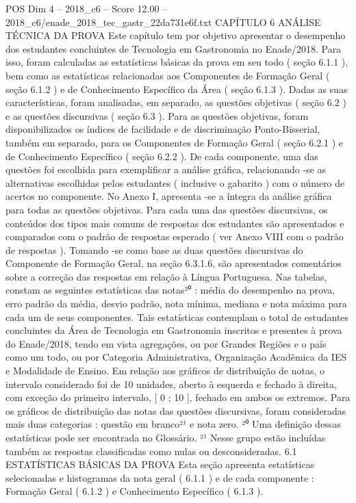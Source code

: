 \begin{textsample}{POS Dim 4 – 2018\_c6 – Score 12.00 – 2018\_c6/enade\_2018\_tec\_gastr\_22da731e6f.txt}  \label{ex:f4_pos_013}
CAPÍTULO 6 ANÁLISE TÉCNICA DA PROVA Este capítulo tem por objetivo apresentar o desempenho dos estudantes concluintes de Tecnologia em Gastronomia no Enade/2018.
Para isso, foram calculadas as estatísticas básicas da prova em seu todo ( seção 6.1.1 ), bem como as estatísticas relacionadas aos Componentes de Formação Geral ( seção 6.1.2 ) e de Conhecimento Específico da Área ( seção 6.1.3 ).
Dadas as suas características, foram analisadas, em separado, as questões objetivas ( seção 6.2 ) e as questões discursivas ( seção 6.3 ).
Para as questões objetivas, foram disponibilizados os índices de facilidade e de discriminação Ponto-Bisserial, também em separado, para os Componentes de Formação Geral ( seção 6.2.1 ) e de Conhecimento Específico ( seção 6.2.2 ).
De cada componente, uma das questões foi escolhida para exemplificar a análise gráfica, relacionando -se as alternativas escolhidas pelos estudantes ( inclusive o gabarito ) com o número de acertos no componente.
No Anexo I, apresenta -se a íntegra da análise gráfica para todas as questões objetivas.
Para cada uma das questões discursivas, os conteúdos dos tipos mais comuns de respostas dos estudantes são apresentados e comparados com o padrão de respostas esperado ( ver Anexo VIII com o padrão de respostas ).
Tomando -se como base as duas questões discursivas do Componente de Formação Geral, na seção 6.3.1.6, são apresentados comentários sobre a correção das respostas em relação à Língua Portuguesa.
Nas tabelas, constam as seguintes estatísticas das notas²⁰ : média do desempenho na prova, erro padrão da média, desvio padrão, nota mínima, mediana e nota máxima para cada um de seus componentes.
Tais estatísticas contemplam o total de estudantes concluintes da Área de Tecnologia em Gastronomia inscritos e presentes à prova do Enade/2018, tendo em vista agregações, ou por Grandes Regiões e o país como um todo, ou por Categoria Administrativa, Organização Acadêmica da IES e Modalidade de Ensino.
Em relação aos gráficos de distribuição de notas, o intervalo considerado foi de 10 unidades, aberto à esquerda e fechado à direita, com exceção do primeiro intervalo, [ 0 ; 10 ], fechado em ambos os extremos.
Para os gráficos de distribuição das notas das questões discursivas, foram consideradas mais duas categorias : questão em branco²¹ e nota zero. ²⁰ Uma definição dessas estatísticas pode ser encontrada no Glossário. ²¹ Nesse grupo estão incluídas também as respostas classificadas como nulas ou desconsideradas. 6.1 ESTATÍSTICAS BÁSICAS DA PROVA Esta seção apresenta estatísticas selecionadas e histogramas da nota geral ( 6.1.1 ) e de cada componente : Formação Geral ( 6.1.2 ) e Conhecimento Específico ( 6.1.3 ).

\end{textsample}
